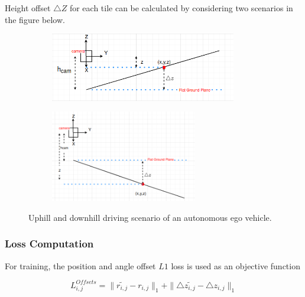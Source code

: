         
        Height offset $\triangle Z$ for each tile can be calculated by considering two scenarios in the figure below. 
        \begin{figure}[h]
        \centering
        \begin{subfigure}{0.4\textwidth}
        \includegraphics[width=1.2\linewidth, height=3cm]{images/delta_z_uphill.png} 
        \caption{}
        \label{fig:subim1}
        \end{subfigure}
        \begin{subfigure}{0.4\textwidth}
        \includegraphics[width=1\linewidth, height=4cm]{images/delat_z_downhill.png}
        \caption{}
        \label{fig:subim2}
        \end{subfigure}
        
        \caption{Uphill and downhill driving scenario of an autonomous ego vehicle.}
        \label{fig:image2}
        \end{figure}
        
        
        \subsubsection{Loss Computation}
            For training, the position and angle offset $L1$ loss is used as an objective function \cite{DBLP:journals/corr/abs-2011-01535}
            
            \begin{equation}
                L^{Offsets}_{i,j} = \parallel \widetilde{r_{i,j}} - r_{i,j} \parallel_{1} + \parallel \triangle{\widetilde{z_{i,j}}} - \triangle{z_{i,j}} \parallel_{1} 
             \end{equation}
             

